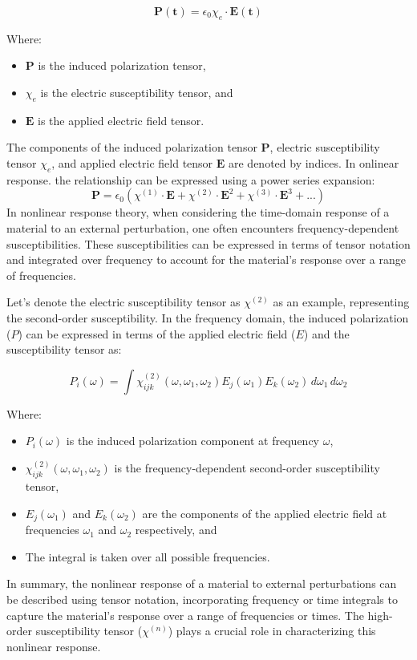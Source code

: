 \[
\mathbf{P(t)} =\epsilon_0 \chi_e \cdot \mathbf{E(t)}
\]

Where:
\begin{itemize}
    \item $\mathbf{P}$ is the induced polarization tensor,
    \item $\chi_e$ is the electric susceptibility tensor, and
    \item $\mathbf{E}$ is the applied electric field tensor.
\end{itemize}

The components of the induced polarization tensor $\mathbf{P}$, electric susceptibility tensor $\chi_e$, and applied electric field tensor $\mathbf{E}$ are denoted by indices.
In onlinear response. the relationship can be expressed using a power series expansion:
\[
    \mathbf{P} =\epsilon_0( \chi^{(1)} \cdot \mathbf{E}+\chi^{(2)} \cdot \mathbf{E}^2 + \chi^{(3)}
    \cdot \mathbf{E}^3 + ...)
\]
In nonlinear response theory, when considering the time-domain response of a material to an external perturbation, one often encounters frequency-dependent susceptibilities. These susceptibilities can be expressed in terms of tensor notation and integrated over frequency to account for the material's response over a range of frequencies.

Let's denote the electric susceptibility tensor as $\chi^{(2)}$ as an example, representing the second-order susceptibility. In the frequency domain, the induced polarization ($P$) can be expressed in terms of the applied electric field ($E$) and the susceptibility tensor as:

\[
P_i(\omega) = \int \chi^{(2)}_{ijk}(\omega, \omega_1, \omega_2) E_j(\omega_1) E_k(\omega_2) \, d\omega_1 \, d\omega_2
\]

Where:
\begin{itemize}
    \item $P_i(\omega)$ is the induced polarization component at frequency $\omega$,
    \item $\chi^{(2)}_{ijk}(\omega, \omega_1, \omega_2)$ is the frequency-dependent second-order susceptibility tensor,
    \item $E_j(\omega_1)$ and $E_k(\omega_2)$ are the components of the applied electric field at frequencies $\omega_1$ and $\omega_2$ respectively, and
    \item The integral is taken over all possible frequencies.
\end{itemize}

In summary, the nonlinear response of a material to external perturbations can be described using
tensor notation, incorporating frequency or time integrals to capture the material's response over
a range of frequencies or times. The high-order susceptibility tensor ($\chi^{(n)}$) plays a crucial role in characterizing this nonlinear response.



